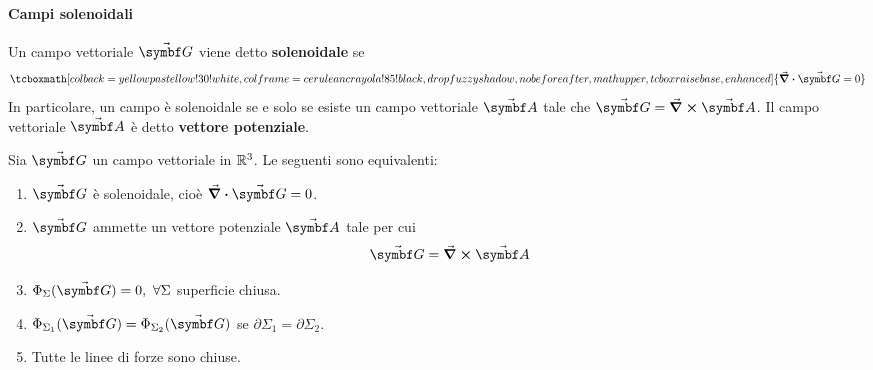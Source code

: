 \paragraph{Campi solenoidali}\label{CampoSolenoidale}
\begin{define}
	Un campo vettoriale $\vba{G}$ viene detto \textbf{solenoidale} se
	\begin{equation}
		\tcboxmath[colback=yellowpastellow!30!white,colframe=ceruleancrayola!85!black,drop fuzzy shadow, nobeforeafter, math upper, tcbox raise base, enhanced]{\div{\vba{G}}=0}
	\end{equation}
	In particolare, un campo è solenoidale se e solo se esiste un campo vettoriale $\vba{A}$ tale che $\vba{G}=\curl{\vba{A}}$. Il campo vettoriale $\vba{A}$ è detto \textbf{vettore potenziale}.
\end{define}
\begin{theorema}
	Sia $\vba{G}$ un campo vettoriale in $\mathbb{R}^3$. Le seguenti sono equivalenti:
	\begin{enumerate}[label=\roman*)]
		\item $\vba{G}$ è solenoidale, cioè $\div{\vba{G}}=0$.
		\item $\vba{G}$ ammette un vettore potenziale $\vba{A}$ tale per cui
		\begin{equation*}
			\vba{G}=\curl{\vba{A}}
		\end{equation*}
		\item $\Phi_{\Sigma}(\vba{G})=0,\ \forall \Sigma$ superficie chiusa.
		\item $\Phi_{\Sigma_1}(\vba{G})=\Phi_{\Sigma_2}(\vba{G})$ se $\partial\Sigma_1=\partial\Sigma_2$.
		\item Tutte le linee di forze sono chiuse.
	\end{enumerate}
\end{theorema}
